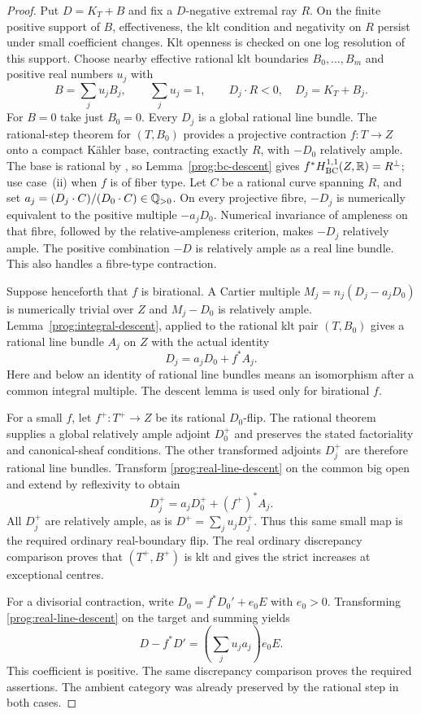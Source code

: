 \begin{proof}
Put $D=K_T+B$ and fix a $D$-negative extremal ray $R$. On the finite
positive support of $B$, effectiveness, the klt condition and negativity
on $R$ persist under small coefficient changes. Klt openness is checked
on one log resolution of this support. Choose nearby effective rational
klt boundaries $B_0,\ldots,B_m$ and positive real numbers $u_j$ with
\[
 B=\sum_j u_jB_j,\qquad \sum_j u_j=1,
 \qquad D_j\cdot R<0,\quad D_j=K_T+B_j.
\]
For $B=0$ take just $B_0=0$. Every $D_j$ is a global rational line
bundle. The rational-step theorem for $(T,B_0)$ provides a projective
contraction $f:T\to Z$ onto a compact K\"ahler base, contracting
exactly $R$, with $-D_0$ relatively ample. The base is rational by
\cite[Lemma~8.8]{DHP}, so Lemma~\ref{prog:bc-descent} gives
$f^*H^{1,1}_{\mathrm{BC}}(Z,\mathbb R)=R^\perp$; use case~(ii) when $f$ is of
fiber type.
Let $C$ be a rational curve spanning $R$, and set
$a_j=(D_j\cdot C)/(D_0\cdot C)\in\mathbb Q_{>0}$. On every projective
fibre, $-D_j$ is numerically equivalent to the positive multiple
$-a_jD_0$. Numerical invariance of ampleness on that fibre, followed
by the relative-ampleness criterion, makes $-D_j$ relatively ample.
The positive combination $-D$ is relatively ample as a real line
bundle. This also handles a fibre-type contraction.

Suppose henceforth that $f$ is birational. A Cartier multiple
$M_j=n_j(D_j-a_jD_0)$ is numerically trivial over $Z$ and
$M_j-D_0$ is relatively ample. Lemma~\ref{prog:integral-descent},
applied to the rational klt pair $(T,B_0)$ gives a rational line bundle
$A_j$ on $Z$ with the actual identity
\begin{equation}\label{prog:real-line-descent}
 D_j=a_jD_0+f^*A_j.
\end{equation}
Here and below an identity of rational line bundles means an isomorphism
after a common integral multiple. The descent lemma is used only for
birational $f$.

For a small $f$, let $f^+:T^+\to Z$ be its rational $D_0$-flip.
The rational theorem supplies a global relatively ample adjoint
$D_0^+$ and preserves the stated factoriality and canonical-sheaf
conditions. The other transformed adjoints $D_j^+$ are therefore
rational line bundles. Transform \eqref{prog:real-line-descent} on the common
big open and extend by reflexivity to obtain
\[
 D_j^+=a_jD_0^++(f^+)^*A_j.
\]
All $D_j^+$ are relatively ample, as is
$D^+=\sum_j u_jD_j^+$. Thus this same small map is the required
ordinary real-boundary flip. The real ordinary discrepancy comparison
proves that $(T^+,B^+)$ is klt and gives the strict increases at
exceptional centres.

For a divisorial contraction, write
$D_0=f^*D_0'+e_0E$ with $e_0>0$. Transforming
\eqref{prog:real-line-descent} on the target and summing yields
\[
 D-f^*D'=\left(\sum_j u_ja_j\right)e_0E.
\]
This coefficient is positive. The same discrepancy comparison proves
the required assertions. The ambient category was already preserved
by the rational step in both cases.
\end{proof}


